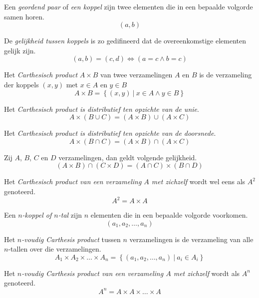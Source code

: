 \documentclass[main.tex]{subfiles}
\begin{document}
\begin{de}
  Een \emph{geordend paar} of \emph{een koppel} zijn twee elementen die in een bepaalde volgorde samen horen.
  \[ (a,b) \]
\end{de}

\begin{de}
  De \emph{gelijkheid tussen koppels} is zo gedifineerd dat de overeenkomstige elementen gelijk zijn.
  \[ (a,b) = (c,d) \Leftrightarrow (a = c \wedge b = c) \] 
\end{de}

\begin{de}
  Het \emph{Carthesisch product} $A \times B$ van twee verzamelingen $A$ en $B$ is de verzameling der koppels $(x,y)$ met $x \in A$ en $y \in B$
  \[ A \times B = \left\{ (x,y) \ |\ x \in A \wedge y \in B \right\} \]
\end{de}

\begin{st}
  Het \emph{Carthesisch product is distributief ten opzichte van de unie}.
  \[ A \times (B \cup C) = (A \times B) \cup (A \times C) \] 
\end{st}
\begin{st}
  Het \emph{Carthesisch product is distributief ten opzichte van de doorsnede}.
  \[ A \times (B \cap C) = (A \times B) \cap (A \times C) \] 
\end{st}

\begin{st}
  Zij $A$, $B$, $C$ en $D$ verzamelingen, dan geldt volgende gelijkheid.
  \[ (A \times B) \cap (C \times D) = (A \cap C) \times (B \cap D) \]
\end{st}

\begin{de}
  Het \emph{Carthesisch product van een verzameling $A$ met zichzelf} wordt wel eens als $A^{2}$ genoteerd.
  \[ A^{2} = A \times A \]
\end{de}

\begin{de}
  Een \emph{$n$-koppel of $n$-tal} zijn $n$ elementen die in een bepaalde volgorde voorkomen.
  \[ (a_{1}, a_{2}, \ldots, a_{n}) \]
\end{de}

\begin{de}
  Het \emph{$n$-voudig Carthesis product} tussen $n$ verzamelingen is de verzameling van alle $n$-tallen over die verzamelingen.
  \[ A_{1} \times A_{2} \times \ldots \times A_{n} = \left\{ (a_{1}, a_{2}, \ldots, a_{n}) \ |\ a_{i} \in A_{i} \right\}\]
\end{de}

\begin{de}
  Het \emph{$n$-voudig Carthesis product van een verzameling $A$ met zichzelf} wordt als $A^{n}$ genoteerd.
  \[ A^{n} = A \times A \times \ldots \times A\]
\end{de}
\end{document}
